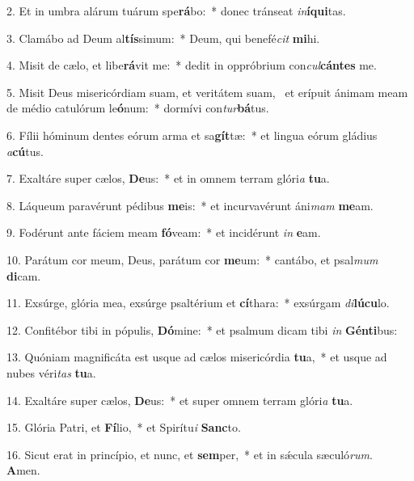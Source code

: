 2. Et in umbra alárum tuárum spe\textbf{rá}bo:~*  donec tránseat \textit{in}\textbf{í}\textbf{qui}tas.\

3. Clamábo ad Deum al\textbf{tís}simum:~*  Deum, qui benefé\textit{cit} \textbf{mi}hi.\

4. Misit de cælo, et libe\textbf{rá}vit me:~*  dedit in oppróbrium con\textit{cul}\textbf{cán}\textbf{tes} me.\

5. Misit Deus misericórdiam suam, et veritátem suam, \dag\  et erípuit ánimam meam de médio catulórum le\textbf{ó}num:~*  dormívi con\textit{tur}\textbf{bá}tus.\

6. Fílii hóminum dentes eórum arma et sa\textbf{gít}tæ:~*  et lingua eórum gládius \textit{a}\textbf{cú}tus.\

7. Exaltáre super cælos, \textbf{De}us:~*  et in omnem terram glóri\textit{a} \textbf{tu}a.\

8. Láqueum paravérunt pédibus \textbf{me}is:~*  et incurvavérunt áni\textit{mam} \textbf{me}am.\

9. Fodérunt ante fáciem meam \textbf{fó}veam:~*  et incidérunt \textit{in} \textbf{e}am.\

10. Parátum cor meum, Deus, parátum cor \textbf{me}um:~*  cantábo, et psal\textit{mum} \textbf{di}cam.\

11. Exsúrge, glória mea, exsúrge psaltérium et \textbf{cí}thara:~*  exsúrgam \textit{di}\textbf{lú}\textbf{cu}lo.\

12. Confitébor tibi in pópulis, \textbf{Dó}mine:~*  et psalmum dicam tibi \textit{in} \textbf{Gén}\textbf{ti}bus:\

13. Quóniam magnificáta est usque ad cælos misericórdia \textbf{tu}a,~*  et usque ad nubes véri\textit{tas} \textbf{tu}a.\

14. Exaltáre super cælos, \textbf{De}us:~*  et super omnem terram glóri\textit{a} \textbf{tu}a.\

15. Glória Patri, et \textbf{Fí}lio,~*  et Spirítu\textit{i} \textbf{Sanc}to.\

16. Sicut erat in princípio, et nunc, et \textbf{sem}per,~*  et in sǽcula sæculó\textit{rum}. \textbf{A}men.\

